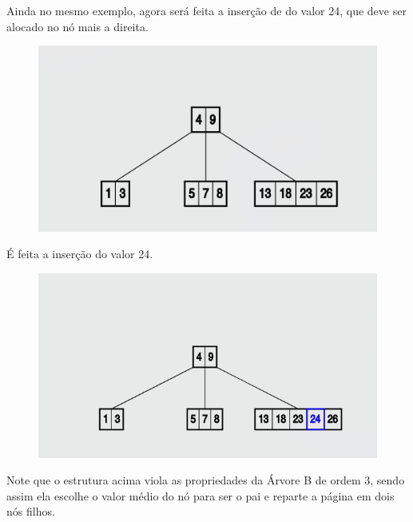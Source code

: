 Ainda no mesmo exemplo, agora será feita a inserção de do valor 24, que deve ser alocado no nó mais a direita.

\begin{figure}[H]
	\centering
	\includegraphics[scale=0.5]{figures/insertion2.png}
\end{figure}

É feita a inserção do valor 24.

\begin{figure}[H]
	\centering
	\includegraphics[scale=0.5]{figures/insertion3.png}
\end{figure}

Note que o estrutura acima viola as propriedades da Árvore B de ordem 3, sendo assim ela escolhe o valor médio do nó para ser o pai e reparte a página em dois nós filhos. 

